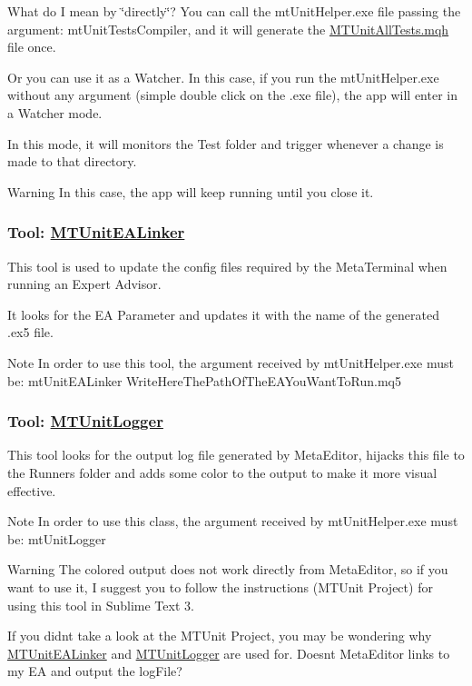 What do I mean by \char`\"{}directly\char`\"{}? You can call the mt\+Unit\+Helper.\+exe file passing the argument\+: mt\+Unit\+Tests\+Compiler, and it will generate the \mbox{\hyperlink{_m_t_unit_all_tests_8mqh}{M\+T\+Unit\+All\+Tests.\+mqh}} file once.

Or you can use it as a Watcher. In this case, if you run the mt\+Unit\+Helper.\+exe without any argument (simple double click on the .exe file), the app will enter in a Watcher mode.

In this mode, it will monitors the Test folder and trigger whenever a change is made to that directory. \begin{DoxyWarning}{Warning}
In this case, the app will keep running until you close it.
\end{DoxyWarning}
\subsubsection*{Tool\+: \mbox{\hyperlink{class_m_t_unit_e_a_linker}{M\+T\+Unit\+E\+A\+Linker}}}

This tool is used to update the config files required by the Meta\+Terminal when running an Expert Advisor.

It looks for the EA Parameter and updates it with the name of the generated .ex5 file. \begin{DoxyNote}{Note}
In order to use this tool, the argument received by mt\+Unit\+Helper.\+exe must be\+: mt\+Unit\+E\+A\+Linker Write\+Here\+The\+Path\+Of\+The\+E\+A\+You\+Want\+To\+Run.\+mq5
\end{DoxyNote}
\subsubsection*{Tool\+: \mbox{\hyperlink{class_m_t_unit_logger}{M\+T\+Unit\+Logger}}}

This tool looks for the output log file generated by Meta\+Editor, hijacks this file to the Runners folder and adds some color to the output to make it more visual effective. \begin{DoxyNote}{Note}
In order to use this class, the argument received by mt\+Unit\+Helper.\+exe must be\+: mt\+Unit\+Logger 
\end{DoxyNote}
\begin{DoxyWarning}{Warning}
The colored output does not work directly from Meta\+Editor, so if you want to use it, I suggest you to follow the instructions (M\+T\+Unit Project) for using this tool in Sublime Text 3.
\end{DoxyWarning}
If you didn\textquotesingle{}t take a look at the M\+T\+Unit Project, you may be wondering why \mbox{\hyperlink{class_m_t_unit_e_a_linker}{M\+T\+Unit\+E\+A\+Linker}} and \mbox{\hyperlink{class_m_t_unit_logger}{M\+T\+Unit\+Logger}} are used for. Doesn\textquotesingle{}t Meta\+Editor links to my EA and output the log\+File?

